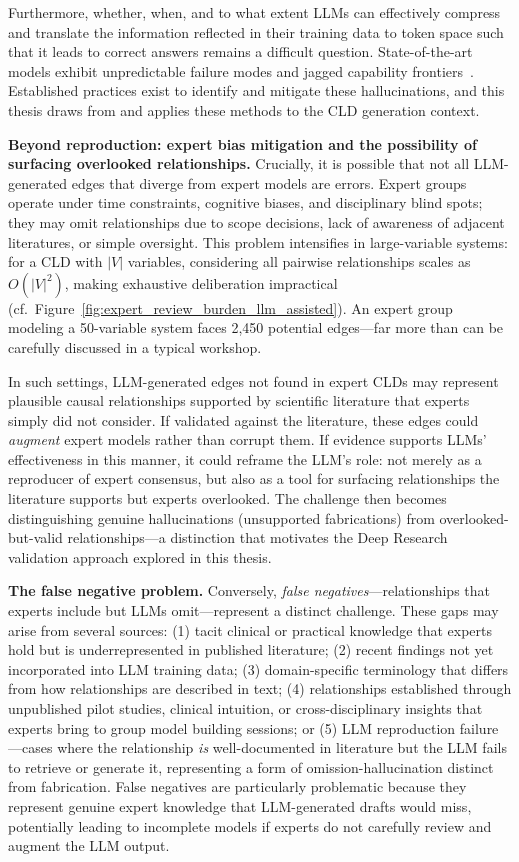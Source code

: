 Furthermore, whether, when, and to what extent LLMs can effectively compress and translate the information reflected in their training data to token space such that it leads to correct answers remains a difficult question. State-of-the-art models exhibit unpredictable failure modes and jagged capability frontiers~\citep{kiciman2024causal}. Established practices exist to identify and mitigate these hallucinations, and this thesis draws from and applies these methods to the CLD generation context.

\medskip
\noindent
\textbf{Beyond reproduction: expert bias mitigation and the possibility of surfacing overlooked relationships.} Crucially, it is possible that not all LLM-generated edges that diverge from expert models are errors. Expert groups operate under time constraints, cognitive biases, and disciplinary blind spots; they may omit relationships due to scope decisions, lack of awareness of adjacent literatures, or simple oversight. This problem intensifies in large-variable systems: for a CLD with $|V|$ variables, considering all pairwise relationships scales as $O(|V|^2)$, making exhaustive deliberation impractical (cf.\ Figure~\ref{fig:expert_review_burden_llm_assisted}). An expert group modeling a 50-variable system faces 2,450 potential edges---far more than can be carefully discussed in a typical workshop.

In such settings, LLM-generated edges not found in expert CLDs may represent plausible causal relationships supported by scientific literature that experts simply did not consider. If validated against the literature, these edges could \emph{augment} expert models rather than corrupt them. If evidence supports LLMs' effectiveness in this manner, it could reframe the LLM's role: not merely as a reproducer of expert consensus, but also as a tool for surfacing relationships the literature supports but experts overlooked. The challenge then becomes distinguishing genuine hallucinations (unsupported fabrications) from overlooked-but-valid relationships---a distinction that motivates the Deep Research validation approach explored in this thesis.

\medskip
\noindent
\textbf{The false negative problem.} Conversely, \emph{false negatives}---relationships that experts include but LLMs omit---represent a distinct challenge. These gaps may arise from several sources: (1) tacit clinical or practical knowledge that experts hold but is underrepresented in published literature; (2) recent findings not yet incorporated into LLM training data; (3) domain-specific terminology that differs from how relationships are described in text; (4) relationships established through unpublished pilot studies, clinical intuition, or cross-disciplinary insights that experts bring to group model building sessions; or (5) LLM reproduction failure---cases where the relationship \emph{is} well-documented in literature but the LLM fails to retrieve or generate it, representing a form of omission-hallucination distinct from fabrication. False negatives are particularly problematic because they represent genuine expert knowledge that LLM-generated drafts would miss, potentially leading to incomplete models if experts do not carefully review and augment the LLM output.

